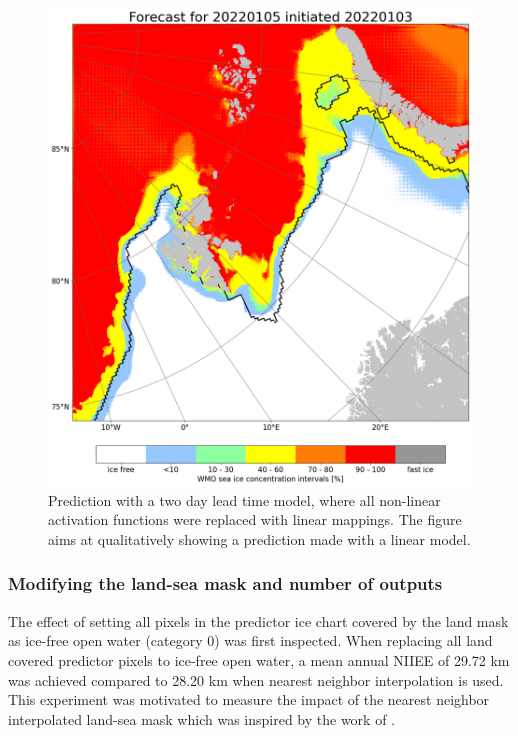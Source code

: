 \documentclass[../main/thesis]{subfiles}
\begin{document}
\begin{figure}
    \centering
    \includegraphics[width=\textwidth]{linear_model_jan}
    \caption{\label{fig:linear_model}Prediction with a two day lead time model, where all non-linear activation functions were replaced with linear mappings. The figure aims at qualitatively showing a prediction made with a linear model.}
\end{figure}

\subsubsection{Modifying the land-sea mask and number of outputs}
\label{sec:modifyhyperparam}
The effect of setting all pixels in the predictor ice chart covered by the land mask as ice-free open water (category 0) was first inspected. When replacing all land covered predictor pixels to ice-free open water, a mean annual NIIEE of 29.72 km was achieved compared to 28.20 km when nearest neighbor interpolation is used. This experiment was motivated to measure the impact of the nearest neighbor interpolated land-sea mask which was inspired by the work of \citet{Wang2017}.
\end{document}
